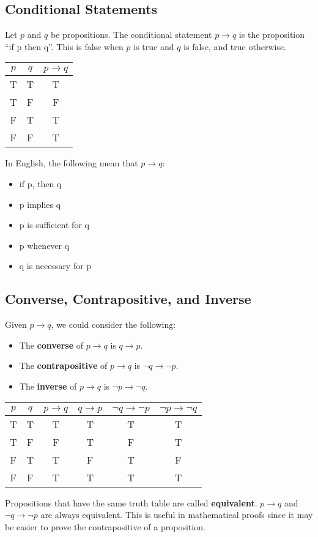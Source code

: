 \documentclass[letterpaper, 12pt]{math}
\begin{document}
\subsection*{Conditional Statements}
Let \( p \) and \( q \) be propositions. The conditional statement
\( p \to q \) is the proposition ``if p then q''. This is false when
\( p \) is true and \( q \) is false, and true otherwise.
\begin{center}
  \begin{tabular}{|c|c|c|}
    \hline
    \( p \) & \( q \) & \( p \to q \) \\ \hline
    T       & T       & T \\ \hline
    T       & F       & F \\ \hline
    F       & T       & T \\ \hline
    F       & F       & T \\ \hline
  \end{tabular}
\end{center}
In English, the following mean that \( p \to q \):
\begin{itemize}
  \item if p, then q
  \item p implies q
  \item p is sufficient for q
  \item p whenever q
  \item q is necessary for p
\end{itemize}

\subsection*{Converse, Contrapositive, and Inverse}
Given \( p \to q \), we could consider the following:
\begin{itemize}
  \item The \textbf{converse} of \( p \to q \) is \( q \to p \).
  \item The \textbf{contrapositive} of \( p \to q \) is
    \( \neg{q} \to \neg{p} \).
  \item The \textbf{inverse} of \( p \to q \) is
    \( \neg{p} \to \neg{q} \).
\end{itemize}
\begin{center}
  \begin{tabular}{|c|c|c|c|c|c|}
    \hline
    \( p \) & \( q \) & \( p \to q \) & \( q \to p \) &
      \( \neg{q} \to \neg{p} \) & \( \neg{p} \to \neg{q} \) \\ \hline
    T & T & T & T & T & T \\ \hline
    T & F & F & T & F & T \\ \hline
    F & T & T & F & T & F \\ \hline
    F & F & T & T & T & T \\ \hline
  \end{tabular}
\end{center}
Propositions that have the same truth table are called \textbf{equivalent}.
\( p \to q \) and \( \neg{q} \to \neg{p} \) are always equivalent.
This is useful in mathematical proofs since it may be easier to prove the
contrapositive of a proposition.
\end{document}
